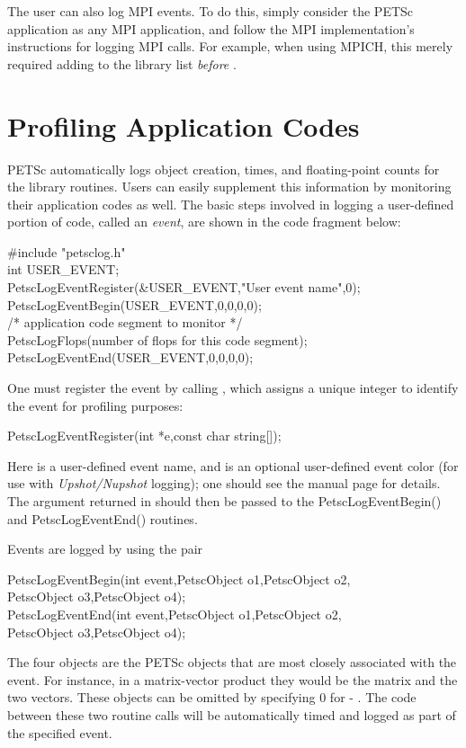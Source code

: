 {{The user can also log MPI events.  To do this, simply consider the
PETSc application as any MPI application, and follow the MPI
implementation's instructions for logging MPI calls. For example, when
using MPICH, this merely required adding  to the library
list {\em before} .

\section{Profiling Application Codes}
\label{sec_profileuser}

PETSc automatically logs object creation, times, and floating-point
counts for the library routines. Users can easily supplement
this information by monitoring their application codes as well.  
The basic steps involved in logging a
user-defined portion of code, called an {\em event}, are shown in the 
code fragment below:
\begin{tabbing}
    \#include "petsclog.h"\\
    int USER\_EVENT;\\
    PetscLogEventRegister(\&USER\_EVENT,"User event name",0);\\
    PetscLogEventBegin(USER\_EVENT,0,0,0,0);\\
       /* application code segment to monitor */\\
       PetscLogFlops(number of flops for this code segment);\\
    PetscLogEventEnd(USER\_EVENT,0,0,0,0);
\end{tabbing}

One must register the event by calling , which assigns a unique integer to identify the
event for profiling purposes: 
\begin{tabbing}
  PetscLogEventRegister(int *e,const char string[]);
\end{tabbing}
Here  is a user-defined event name, and  is an
optional user-defined event color (for use with {\em Upshot/Nupshot} logging);
one should see the manual page for details.  The argument returned in  should then
be passed to the PetscLogEventBegin() and PetscLogEventEnd()
routines.

Events are logged by using the pair 
\begin{tabbing}
   PetscLogEventBegin(int event,PetscObject o1,PetscObject o2,\\
                      PetscObject o3,PetscObject o4);\\
   PetscLogEventEnd(int event,PetscObject o1,PetscObject o2,\\
                    PetscObject o3,PetscObject o4);
\end{tabbing}
The 
four objects are the PETSc objects that are most closely associated 
with the event.  For instance, in a matrix-vector product they 
would be the matrix and the two vectors.  These objects can be omitted
by specifying 0 for  - .  The code between these 
two routine calls will be automatically timed and logged as part of the
specified event.

}}
